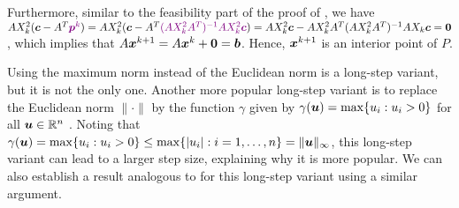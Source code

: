 \begin{enumerate}
\begin{pf}
Furthermore, similar to the feasibility part of the proof of
, we have \(AX_k^{2}(\vect{c}-A^{T}\vc{\vect{p}^{k}})
=AX_{k}^{2}(\vect{c}-A^{T}\vc{(AX_k^{2}A^{T})^{-1}AX_{k}^{2}\vect{c}})
=AX_{k}^{2}\vect{c}-AX_{k}^{2}A^{T}(AX_k^{2}A^{T})^{-1}AX_{k}\vect{c}=\vect{0}\),
which implies that \(A\bm{x}^{k+1}=A\bm{x}^{k}+\bm{0}=\bm{b}\). Hence,
\(\bm{x}^{k+1}\) is an interior point of \(P\).
\end{pf}

Using the maximum norm instead of the Euclidean norm is a long-step variant,
but it is not the only one. Another more popular long-step variant is to
replace the Euclidean norm \(\|\cdot\|\) by the function \(\gamma\) given by
\(\gamma(\bm{u})=\max\{u_i:u_i>0\}\) for all \(\bm{u}\in\mathbb{R}^{n}\) . Noting
that
\(\gamma(\bm{u})=\max\{u_i:u_i>0\}\le\max\{|u_i|:i=1,\dotsc,n\}=\|\bm{u}\|_{\infty}\),
this long-step variant can lead to a larger step size, explaining why it is
more popular. We can also establish a result analogous to
 for this long-step variant using a
similar argument.
\end{enumerate}
